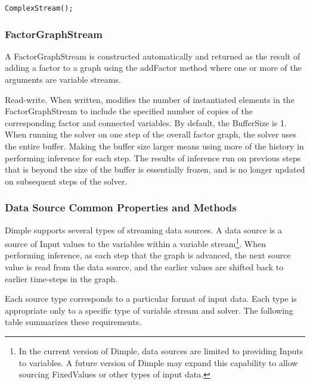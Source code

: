 \ifjava
\begin{lstlisting}
ComplexStream();
\end{lstlisting}
\fi



\subsubsection{FactorGraphStream}

A FactorGraphStream is constructed automatically and returned as the result of adding a factor to a graph using the addFactor method where one or more of the arguments are variable streams.


\label{sec:FactorGraphStream.BufferSize}

Read-write. When written, modifies the number of instantiated elements in the FactorGraphStream to include the specified number of copies of the corresponding factor and connected variables.  By default, the BufferSize is 1.  When running the solver on one step of the overall factor graph, the solver uses the entire buffer.  Making the buffer size larger means using more of the history in performing inference for each step.  The results of inference run on previous steps that is beyond the size of the buffer is essentially frozen, and is no longer updated on subsequent steps of the solver.


\subsubsection{Data Source Common Properties and Methods}
\label{sec:DataSource}

Dimple supports several types of streaming data sources.  A data source is a source of Input values to the variables within a variable stream\footnote{In the current version of Dimple, data sources are limited to providing Inputs to variables.  A future version of Dimple may expand this capability to allow sourcing FixedValues or other types of input data.}.  When performing inference, as each step that the graph is advanced, the next source value is read from the data source, and the earlier values are shifted back to earlier time-steps in the graph.

Each source type corresponds to a particular format of input data.  Each type is appropriate only to a specific type of variable stream and solver.  The following table summarizes these requirements.

